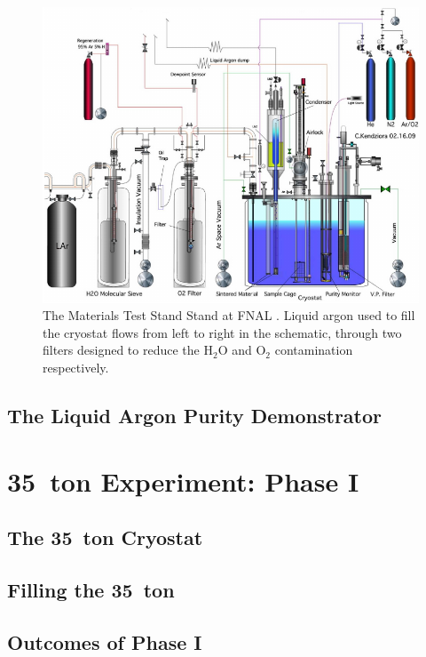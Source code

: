 \begin{figure}
  \centering
  \includegraphics[width=14cm]{MTS.pdf}
  \caption[The Materials Test Stand Stand at FNAL.]{The Materials Test Stand Stand at FNAL \cite{MTS2009b}.  Liquid argon used to fill the cryostat flows from left to right in the schematic, through two filters designed to reduce the H$_2$O and O$_2$ contamination respectively.}
  \label{fig:MTS}
\end{figure}

\subsection{The Liquid Argon Purity Demonstrator}

\section{35~ton Experiment: Phase I}\label{sec:35tonPhaseI}

\subsection{The 35~ton Cryostat}

\subsection{Filling the 35~ton}

\subsection{Outcomes of Phase I}

